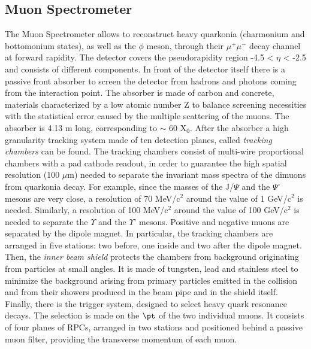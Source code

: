 \subsection*{Muon Spectrometer}
The Muon Spectrometer allows to reconstruct heavy quarkonia (charmonium and bottomonium states), as well as the $\phi$ meson, through their $\mu^+\mu^-$ decay channel at forward rapidity. The detector covers the pseudorapidity region -4.5 < $\eta$ < -2.5 and consists of different components. In front of the detector itself there is a passive front absorber to screen the detector from hadrons and photons coming from the interaction point. The absorber is made of carbon and concrete, materials characterized by a low atomic number Z to balance screening necessities with the statistical error caused by the multiple scattering of the muons. The absorber is 4.13 m long, corresponding to  $\sim$ 60 X$_0$. After the absorber a high granularity tracking system made of ten detection planes, called \textit{tracking chambers} can be found. The tracking chambers consist of multi-wire proportional chambers with a pad cathode readout, in order to guarantee the high spatial resolution (100 $\mu$m) needed to separate the invariant mass spectra of the dimuons from quarkonia decay. For example, since the masses of the J/$\Psi$ and the $\Psi$' mesons are very close, a resolution of 70 MeV/c$^2$ around the value of 1 GeV/c$^2$ is needed. Similarly, a resolution of 100 MeV/c$^2$ around the value of 100 GeV/c$^2$ is needed to separate the $\Upsilon$ and the $\Upsilon$' mesons. Positive and negative muons are separated by the dipole magnet. In particular, the tracking chambers are arranged in five stations: two before, one inside and two after the dipole magnet. Then, the \textit{inner beam shield} protects the chambers from background originating from particles at small angles. It is made of tungsten, lead and stainless steel to minimize the background arising from primary particles emitted in the collision and from their showers produced in the beam pipe and in the shield itself. Finally, there is the trigger system, designed to select heavy quark resonance decays. The selection is made on the $\pt$ of the two individual muons. It consists of four planes of RPCs, arranged in two stations and positioned behind a passive muon filter, providing the transverse momentum of each muon.
